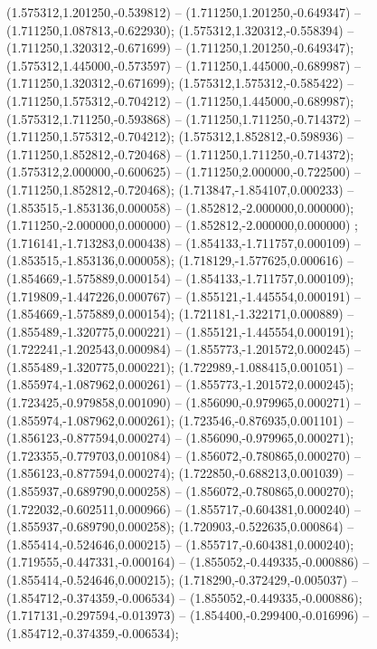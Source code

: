  (1.575312,1.201250,-0.539812) -- (1.711250,1.201250,-0.649347) -- (1.711250,1.087813,-0.622930);
 (1.575312,1.320312,-0.558394) -- (1.711250,1.320312,-0.671699) -- (1.711250,1.201250,-0.649347);
 (1.575312,1.445000,-0.573597) -- (1.711250,1.445000,-0.689987) -- (1.711250,1.320312,-0.671699);
 (1.575312,1.575312,-0.585422) -- (1.711250,1.575312,-0.704212) -- (1.711250,1.445000,-0.689987);
 (1.575312,1.711250,-0.593868) -- (1.711250,1.711250,-0.714372) -- (1.711250,1.575312,-0.704212);
 (1.575312,1.852812,-0.598936) -- (1.711250,1.852812,-0.720468) -- (1.711250,1.711250,-0.714372);
 (1.575312,2.000000,-0.600625) -- (1.711250,2.000000,-0.722500) -- (1.711250,1.852812,-0.720468);
 (1.713847,-1.854107,0.000233) -- (1.853515,-1.853136,0.000058) -- (1.852812,-2.000000,0.000000);
 (1.711250,-2.000000,0.000000) -- (1.852812,-2.000000,0.000000) ;
 (1.716141,-1.713283,0.000438) -- (1.854133,-1.711757,0.000109) -- (1.853515,-1.853136,0.000058);
 (1.718129,-1.577625,0.000616) -- (1.854669,-1.575889,0.000154) -- (1.854133,-1.711757,0.000109);
 (1.719809,-1.447226,0.000767) -- (1.855121,-1.445554,0.000191) -- (1.854669,-1.575889,0.000154);
 (1.721181,-1.322171,0.000889) -- (1.855489,-1.320775,0.000221) -- (1.855121,-1.445554,0.000191);
 (1.722241,-1.202543,0.000984) -- (1.855773,-1.201572,0.000245) -- (1.855489,-1.320775,0.000221);
 (1.722989,-1.088415,0.001051) -- (1.855974,-1.087962,0.000261) -- (1.855773,-1.201572,0.000245);
 (1.723425,-0.979858,0.001090) -- (1.856090,-0.979965,0.000271) -- (1.855974,-1.087962,0.000261);
 (1.723546,-0.876935,0.001101) -- (1.856123,-0.877594,0.000274) -- (1.856090,-0.979965,0.000271);
 (1.723355,-0.779703,0.001084) -- (1.856072,-0.780865,0.000270) -- (1.856123,-0.877594,0.000274);
 (1.722850,-0.688213,0.001039) -- (1.855937,-0.689790,0.000258) -- (1.856072,-0.780865,0.000270);
 (1.722032,-0.602511,0.000966) -- (1.855717,-0.604381,0.000240) -- (1.855937,-0.689790,0.000258);
 (1.720903,-0.522635,0.000864) -- (1.855414,-0.524646,0.000215) -- (1.855717,-0.604381,0.000240);
 (1.719555,-0.447331,-0.000164) -- (1.855052,-0.449335,-0.000886) -- (1.855414,-0.524646,0.000215);
 (1.718290,-0.372429,-0.005037) -- (1.854712,-0.374359,-0.006534) -- (1.855052,-0.449335,-0.000886);
 (1.717131,-0.297594,-0.013973) -- (1.854400,-0.299400,-0.016996) -- (1.854712,-0.374359,-0.006534);
